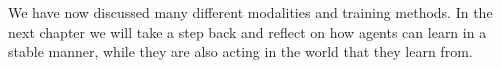 We have now discussed many different modalities and training methods. In the next chapter we will take a step back and reflect on  how agents can learn in a stable manner, while they are also acting in the world that they learn from.







%
%
%
%
